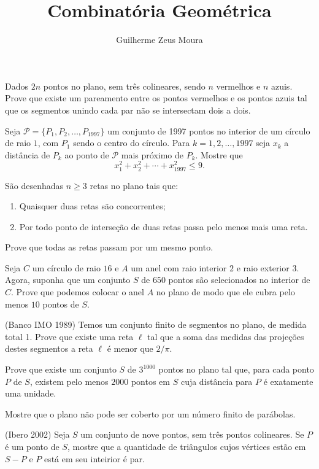 \documentclass[10pt,a4paper]{article}
\title{Combinatória Geométrica}
\author{Guilherme Zeus Moura}
\begin{document}
	
	\zeustitle
	\begin{prob}
		Dados $2n$ pontos no plano, sem três colineares, sendo $n$ vermelhos e $n$ azuis. Prove que existe um pareamento entre os pontos vermelhos e os pontos azuis tal que os segmentos unindo cada par não se intersectam dois a dois.
	\end{prob}
	\begin{prob}[Ibero 1997]
		Seja $\mathcal{P} = \{P_1, P_2, \dots, P_{1997}\}$ um conjunto de 1997 pontos no interior de um círculo de raio $1$, com $P_1$ sendo o centro do círculo. Para $k = 1, 2, \dots, 1997$ seja $x_k$ a distância de $P_k$ ao ponto de $\mathcal{P}$ mais próximo de $P_k$. Mostre que $$ x_1^2 + x_2^2 + \cdots + x_{1997}^2 \le 9.$$
	\end{prob}
	\begin{prob}
		São desenhadas $n \ge 3$ retas no plano tais que:
		\begin{enumerate}[label = (\roman*)]
			\item Quaisquer duas retas são concorrentes;
			\item Por todo ponto de interseção de duas retas passa pelo menos mais uma reta.
		\end{enumerate}
		Prove que todas as retas passam por um mesmo ponto.
	\end{prob}
	\begin{prob}
		Seja $C$ um círculo de raio $16$ e $A$ um anel com raio interior $2$ e raio exterior $3$. Agora, suponha que um conjunto $S$ de $650$ pontos são selecionados no interior de $C$. Prove que podemos colocar o anel $A$ no plano de modo que ele cubra pelo menos $10$ pontos de $S$.
	\end{prob}
	\begin{prob}(Banco IMO 1989)
		Temos um conjunto finito de segmentos no plano, de medida total 1. Prove que existe uma reta $\ell$ tal que a soma das medidas das projeções destes segmentos a reta $\ell$ é menor que $2/\pi$.
	\end{prob}
	\begin{prob}
		Prove que existe um conjunto $S$ de $3^{1000}$ pontos no plano tal que, para cada ponto $P$ de $S$, existem pelo menos $2000$ pontos em $S$ cuja distância para $P$ é exatamente uma unidade.
	\end{prob}
	\begin{prob}[Turquia]
		Mostre que o plano não pode ser coberto por um número finito de parábolas.
	\end{prob}
	\begin{prob}(Ibero 2002)
		Seja $S$ um conjunto de nove pontos, sem três pontos colineares. Se $P$ é um ponto de $S$, mostre que a quantidade de triângulos cujos vértices estão em $S - {P}$ e $P$ está em seu inteirior é par.
	\end{prob}
\end{document}
